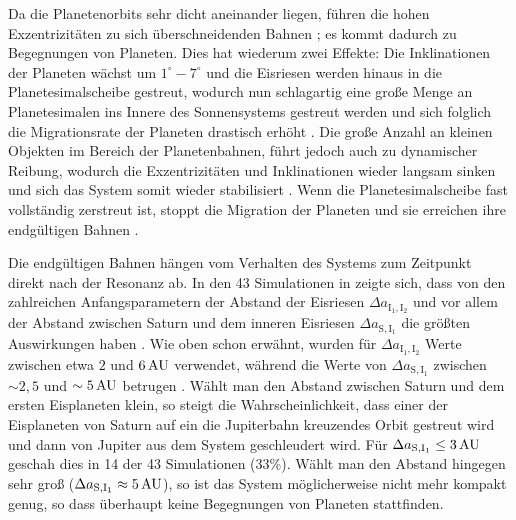 \documentclass[12pt,a4paper,twoside,open=right,bibliography=totoc]{scrbook}
\renewcommand{\cite}{ \citep}
\begin{document}
Da die Planetenorbits sehr dicht aneinander liegen, führen die hohen Exzentrizitäten zu sich überschneidenden Bahnen\cite{Tsiganis2005}; es kommt dadurch zu Begegnungen von Planeten.
Dies hat wiederum zwei Effekte: Die Inklinationen der Planeten wächst um $1^\circ-7^\circ$ und die Eisriesen werden hinaus in die Planetesimalscheibe gestreut,
wodurch nun schlagartig eine große Menge an Planetesimalen ins Innere des Sonnensystems gestreut werden und sich folglich die Migrationsrate der Planeten drastisch erhöht\cite{Tsiganis2005}.
Die große Anzahl an kleinen Objekten im Bereich der Planetenbahnen, führt jedoch auch zu dynamischer Reibung,
wodurch die Exzentrizitäten und Inklinationen wieder langsam sinken und sich das System somit wieder stabilisiert\cite{Tsiganis2005}.
Wenn die Planetesimalscheibe fast vollständig zerstreut ist, stoppt die Migration der Planeten und sie erreichen ihre endgültigen Bahnen\cite{Tsiganis2005}.

\newcommand{\DII}{\Delta a_{\mathrm{I}_1,\mathrm{I}_2}}
\newcommand{\DSI}{\Delta a_{\mathrm{S},\mathrm{I}_1}}
Die endgültigen Bahnen hängen vom Verhalten des Systems zum Zeitpunkt direkt nach der Resonanz ab. In den 43 Simulationen in \cite{Tsiganis2005} zeigte sich, dass von den zahlreichen Anfangsparametern der Abstand der Eisriesen $\DII$ und vor allem der Abstand zwischen Saturn und dem inneren Eisriesen $\DSI$ die größten Auswirkungen haben\cite{Tsiganis2005}.
Wie oben schon erwähnt, wurden für $\DII$ Werte zwischen etwa $2$ und $\unit[6]{AU}$ verwendet, während die Werte von $\DSI$ zwischen $\sim2,5$ und $\unit[\sim5]{AU}$ betrugen\cite{Tsiganis2005}.
Wählt man den Abstand zwischen Saturn und dem ersten Eisplaneten klein, so steigt die Wahrscheinlichkeit, dass einer der Eisplaneten von Saturn auf ein die Jupiterbahn kreuzendes Orbit gestreut wird und dann von Jupiter aus dem System geschleudert wird. Für $\DSI \le \unit[3]{AU} $ geschah dies in 14 der 43 Simulationen (33\%).
Wählt man den Abstand hingegen sehr groß ($\DSI \approx \unit[5]{AU}$), so ist das System möglicherweise nicht mehr kompakt genug, so dass überhaupt keine Begegnungen von Planeten stattfinden.
\end{document}
